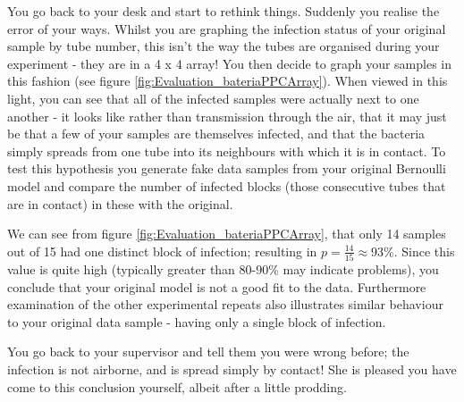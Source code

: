\documentclass[11pt,fullpage]{book}
\begin{document}
You go back to your desk and start to rethink things. Suddenly you realise the error of your ways. Whilst you are graphing the infection status of your original sample by tube number, this isn't the way the tubes are organised during your experiment - they are in a 4 x 4 array! You then decide to graph your samples in this fashion (see figure \ref{fig:Evaluation_bateriaPPCArray}). When viewed in this light, you can see that all of the infected samples were actually next to one another - it looks like rather than transmission through the air, that it may just be that a few of your samples are themselves infected, and that the bacteria simply spreads from one tube into its neighbours with which it is in contact. To test this hypothesis you generate fake data samples from your original Bernoulli model and compare the number of infected blocks (those consecutive tubes that are in contact) in these with the original. 

We can see from figure \ref{fig:Evaluation_bateriaPPCArray}, that only 14 samples out of 15 had one distinct block of infection; resulting in $p=\frac{14}{15}\approx 93\%$. Since this value is quite high (typically greater than 80-90\% may indicate problems), you conclude that your original model is not a good fit to the data. Furthermore examination of the other experimental repeats also illustrates similar behaviour to your original data sample - having only a single block of infection. 

You go back to your supervisor and tell them you were wrong before; the infection is not airborne, and is spread simply by contact! She is pleased you have come to this conclusion yourself, albeit after a little prodding.  
\end{document}
